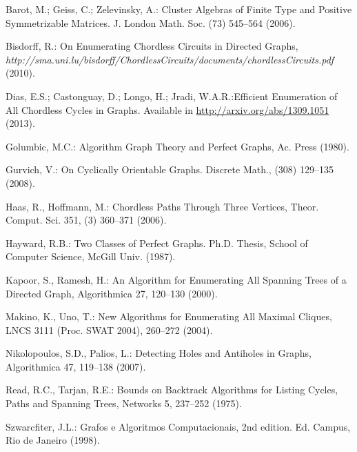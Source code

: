 \documentclass{lawcg}
\begin{document}
\begin{thebibliography}{}
\small

 Barot, M.; Geiss, C.; Zelevinsky, A.: Cluster Algebras of Finite Type and Positive Symmetrizable Matrices. J. London Math. Soc. (73) 545--564 (2006).

 Bisdorff, R.: On Enumerating Chordless Circuits in Directed Graphs, {\it http://sma.uni.lu/bisdorff/ChordlessCircuits/documents/chordlessCircuits.pdf} (2010).





 Dias, E.S.; Castonguay, D.; Longo, H.; Jradi, W.A.R.:Efficient Enumeration of All Chordless Cycles in Graphs. Available in \url{http://arxiv.org/abs/1309.1051} (2013).





 Golumbic, M.C.: Algorithm Graph Theory and Perfect Graphs, Ac. Press (1980).

 Gurvich, V.: On Cyclically Orientable Graphs. Discrete Math., (308) 129--135 (2008).

 Haas, R., Hoffmann, M.: Chordless Paths Through Three Vertices, Theor. Comput. Sci. 351, (3) 360--371 (2006).

 Hayward, R.B.: Two Classes of Perfect Graphs. Ph.D. Thesis, School of Computer Science, McGill Univ. (1987).

 Kapoor, S., Ramesh, H.: An Algorithm for Enumerating All Spanning Trees of a Directed Graph, Algorithmica 27, 120--130 (2000).





 Makino, K., Uno, T.: New Algorithms for Enumerating All Maximal Cliques, LNCS 3111 (Proc. SWAT 2004), 260--272 (2004).

 Nikolopoulos, S.D., Palios, L.: Detecting Holes and Antiholes in Graphs, Algorithmica 47, 119--138 (2007).



 Read, R.C., Tarjan, R.E.: Bounds on Backtrack Algorithms for Listing Cycles, Paths and Spanning Trees, Networks 5, 237--252 (1975).



 Szwarcfiter, J.L.: Grafos e Algoritmos Computacionais, 2nd edition. Ed. Campus, Rio de Janeiro (1998).




\end{thebibliography}
\end{document}
